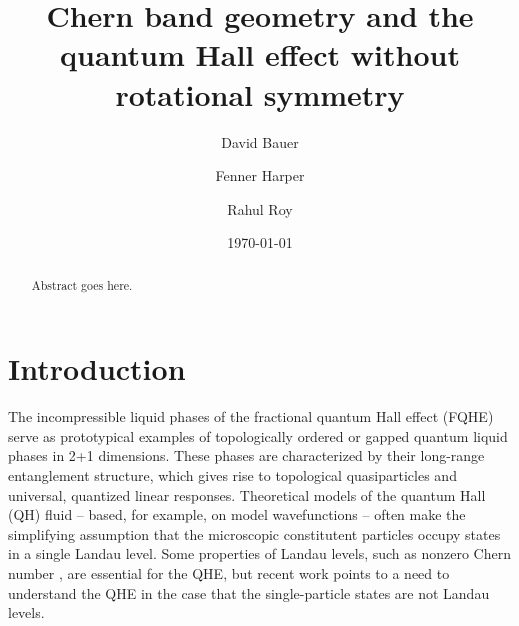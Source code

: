 \documentclass[aps,prb,twocolumn,letterpaper,twoside,nobalancelastpage,groupedaddress,amsmath,amssymb,floatfix,citeautoscript]{revtex4-1}
\begin{document}
\def \Ns {\mathbb{N}}
\def \Rs {\mathbb{R}}
\def \Zs {\mathbb{Z}}
\def \Qs {\mathbb{Q}}
\def \Cs {\mathbb{C}}
\def \id {\mathbb{I}}

\def \bfq {{\bf q}}
\def \bfp {{\bf p}}
\def \bfx {{\bf x}}
\def \bfy {{\bf y}}
\def \bfz {{\bf z}}
\def \bfr {{\bf r}}
\def \bfk {{\bf k}}
\def \bfn {{\bf n}}
\def \bfb {{\bf b}}
\def \bfm {\mathbf{m}}
\def \bfn {\mathbf{n}}


\def \hatq {\widehat{q}}
\def \hatp {\widehat{p}}
\def \hata {\widehat{a}}
\def \hatadag {\widehat{a}^{\dagger}}
\def \wtN {\widetilde{N}}

\def \ve {\varepsilon}
\def \vth {\vartheta}



\title{Chern band geometry and the quantum Hall effect without rotational symmetry}
\author{David Bauer}

\author{Fenner Harper}

\author{Rahul Roy}

\date{\today}
\begin{abstract}
Abstract goes here.
 
\end{abstract}


\maketitle

\section{Introduction}
The incompressible liquid phases of the fractional quantum Hall effect (FQHE) serve as prototypical examples of topologically ordered or gapped quantum liquid phases\cite{yoshioka_quantum_2002,fradkin_field_2013} in 2+1 dimensions. These phases are characterized by their long-range entanglement structure, which gives rise to topological quasiparticles and universal, quantized linear responses. Theoretical models of the quantum Hall (QH) fluid -- based, for example, on model wavefunctions \cite{laughlin_anomalous_1983} -- often make the simplifying assumption that the microscopic constitutent particles occupy states in a single Landau level. Some properties of Landau levels, such as nonzero Chern number \cite{thouless_quantized_1982}, are essential for the QHE, but recent work points to a need to understand the QHE in the case that the single-particle states are not Landau levels.
\end{document}
